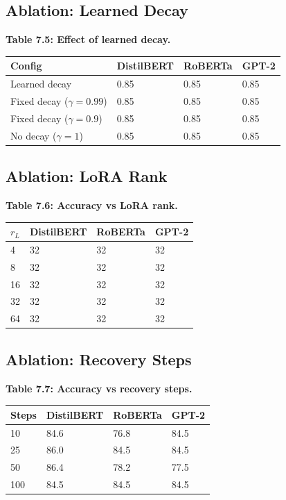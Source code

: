 \subsection{Ablation: Learned Decay}

\textbf{Table 7.5: Effect of learned decay.}

\begin{table}[H]
\centering
\small
\begin{tabular}{llll}
\toprule
\textbf{Config} & \textbf{DistilBERT} & \textbf{RoBERTa} & \textbf{GPT-2} \\
\midrule
Learned decay & 0.85 & 0.85 & 0.85 \\
Fixed decay ($\gamma = 0.99$) & 0.85 & 0.85 & 0.85 \\
Fixed decay ($\gamma = 0.9$) & 0.85 & 0.85 & 0.85 \\
No decay ($\gamma = 1$) & 0.85 & 0.85 & 0.85 \\
\bottomrule
\end{tabular}
\end{table}

\subsection{Ablation: LoRA Rank}

\textbf{Table 7.6: Accuracy vs LoRA rank.}

\begin{table}[H]
\centering
\small
\begin{tabular}{llll}
\toprule
\textbf{$r_L$} & \textbf{DistilBERT} & \textbf{RoBERTa} & \textbf{GPT-2} \\
\midrule
4 & 32 & 32 & 32 \\
8 & 32 & 32 & 32 \\
16 & 32 & 32 & 32 \\
32 & 32 & 32 & 32 \\
64 & 32 & 32 & 32 \\
\bottomrule
\end{tabular}
\end{table}

\subsection{Ablation: Recovery Steps}

\textbf{Table 7.7: Accuracy vs recovery steps.}

\begin{table}[H]
\centering
\small
\begin{tabular}{llll}
\toprule
\textbf{Steps} & \textbf{DistilBERT} & \textbf{RoBERTa} & \textbf{GPT-2} \\
\midrule
10 & 84.6 & 76.8 & 84.5 \\
25 & 86.0 & 84.5 & 84.5 \\
50 & 86.4 & 78.2 & 77.5 \\
100 & 84.5 & 84.5 & 84.5 \\
\bottomrule
\end{tabular}
\end{table}


